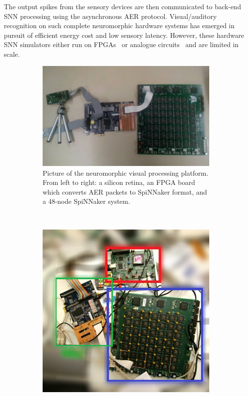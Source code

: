 The output spikes from the sensory devices are then communicated to back-end SNN processing using the asynchronous AER protocol.
Visual/auditory recognition on such complete neuromorphic hardware systems has emerged in pursuit of efficient energy cost and low sensory latency.
However, these hardware SNN simulators either run on FPGAs~\citep{neil2014minitaur, kiselev2016event} or analogue circuits~\citep{qiao2015reconfigurable} and are limited in scale.

	\begin{figure}[tbp!]
	\centering
	\begin{subfigure}[t]{0.8\textwidth}
		\includegraphics[width=\textwidth]{pics_snn/outline2.jpg}
		\caption{Picture of the neuromorphic visual processing platform. From left to right: a silicon retina, an FPGA board which converts AER packets to SpiNNaker format, and a 48-node SpiNNaker system.}
	\end{subfigure}\\
	\begin{subfigure}[t]{0.528\textwidth}
		\includegraphics[width=\textwidth]{pics_snn/photooutline_blurred.jpg}

\end{subfigure}
\end{figure}
